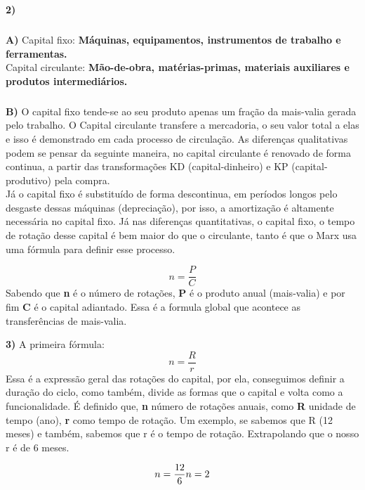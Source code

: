\documentclass[a4paper, 12pt]{article} %
\begin{document}
\vspace{0.5cm}

\par \textbf{2)} 

\subparagraph{} \textbf{A)} Capital fixo: \textbf{Máquinas, equipamentos, instrumentos de trabalho e ferramentas.}
\\
Capital circulante: \textbf{Mão-de-obra, matérias-primas, materiais auxiliares e produtos intermediários.}

\subparagraph{} \textbf{B)} O capital fixo tende-se ao seu produto apenas um fração da mais-valia gerada pelo trabalho. O Capital circulante transfere a mercadoria, o seu valor total a elas e isso é demonstrado em cada processo de circulação.  As diferenças qualitativas podem se pensar da seguinte maneira, no capital circulante é renovado de forma continua, a partir das transformações KD (capital-dinheiro) e KP (capital-produtivo) pela compra.
\\
Já o capital fixo é substituído de forma descontinua, em períodos longos pelo desgaste dessas máquinas (depreciação), por isso, a amortização é altamente necessária no capital fixo. Já nas diferenças quantitativas, o capital fixo, o tempo de rotação desse capital é bem maior do que o circulante, tanto é que o Marx usa uma fórmula para definir esse processo.

\begin{equation}
n = \dfrac{P}{C}
\end{equation}
Sabendo que \textbf{n} é o número de rotações, \textbf{P} é o produto anual (mais-valia) e por fim \textbf{C} é o capital adiantado. Essa é a formula global que acontece as transferências de mais-valia.

\vspace{0.5cm}

\par \textbf{3)} A primeira fórmula:
\begin{equation}
n = \dfrac{R}{r}
\end{equation}
Essa é a expressão geral das rotações do capital, por ela, conseguimos definir a duração do ciclo, como também, divide as formas que o capital e volta como a funcionalidade. É definido que, \textbf{n} número de rotações anuais, como \textbf{R} unidade de tempo (ano), \textbf{r} como tempo de rotação. Um exemplo, se sabemos que R (12 meses) e também, sabemos que r é o tempo de rotação. Extrapolando que o nosso r é de 6 meses.

\begin{equation}
n = \dfrac{12}{6}
$$\\$$
n = 2
\end{equation}
\end{document}

